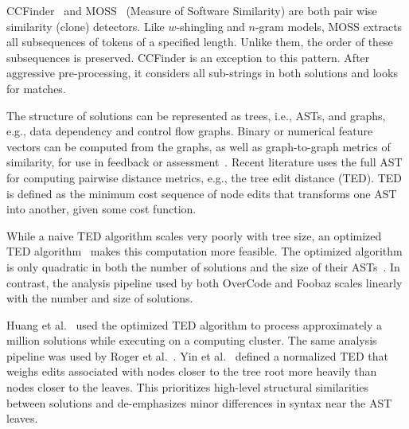 CCFinder~\cite{CCFinder} and MOSS~\cite{schleimer2003winnowing} (Measure of Software Similarity) are both pair wise similarity (clone) detectors. Like $w$-shingling and $n$-gram models, MOSS extracts all subsequences of tokens of a specified length. Unlike them, the order of these subsequences is preserved. CCFinder \cite{CCFinder} is an exception to this pattern. After aggressive pre-processing, it considers all sub-strings in both solutions and looks for matches.


The structure of solutions can be represented as trees, i.e., ASTs, and graphs, e.g., data dependency and control flow graphs. Binary or numerical feature vectors can be computed from the graphs, as well as graph-to-graph metrics of similarity, for use in feedback or assessment~\cite{Robinson:1980,srikant2014system}. Recent literature uses the full AST for computing pairwise distance metrics, e.g., the tree edit distance (TED). TED is defined as the minimum cost sequence of node edits that transforms one AST into another, given some cost function.


While a naive TED algorithm scales very poorly with tree size, an optimized TED algorithm~\cite{shasha1994exact} makes this computation more feasible. The optimized algorithm is only quadratic in both the number of solutions and the size of their ASTs~\cite{MOOCshop}. In contrast, the analysis pipeline used by both OverCode and Foobaz scales linearly with the number and size of solutions. 

Huang et al.~\cite{MOOCshop} used the optimized TED algorithm to process approximately a million solutions while executing on a computing cluster. The same analysis pipeline was used by Roger et al.~\cite{ACESthesis}. Yin et al.~\cite{yin2015clustering} defined a normalized TED that weighs edits associated with nodes closer to the tree root more heavily than nodes closer to the leaves. This prioritizes high-level structural similarities between solutions and de-emphasizes minor differences in syntax near the AST leaves.


